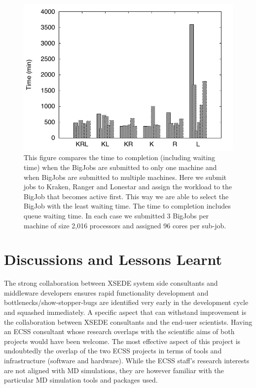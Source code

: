 \documentclass{sig-alternate}
\begin{document}
\begin{figure}
  \centering
  \includegraphics[scale=0.6]{figs/multi_bj_gnu}
  \caption{\footnotesize This figure compares the time to completion
    (including waiting time) when the BigJobs are submitted to only
    one machine and when BigJobs are submitted to multiple
    machines. Here we submit jobs to Kraken, Ranger and Lonestar and
    assign the workload to the BigJob that becomes active first. This
    way we are able to select the BigJob with the least waiting
    time. The time to completion includes queue waiting time. In each
    case we submitted 3 BigJobs per machine of size 2,016 processors
    and assigned 96 cores per sub-job. }
  \label{fig:multi_bigjob}
\end{figure}



\section{Discussions and Lessons Learnt}

The strong collaboration between XSEDE system side consultants
and middleware developers ensures rapid functionality
development and bottlenecks/show-stopper-bugs are identified very
early in the development cycle and squashed immediately. A specific aspect
that can withstand improvement is the collaboration between XSEDE consultants
and the end-user scientists. Having an ECSS consultant whose research overlaps
with the scientific aims of both projects would have been welcome. The most
effective aspect of this project is undoubtedly the overlap of the two ECSS
projects in terms of tools and infrastructure (software and hardware). While the
ECSS staff's research interests are not aligned with MD simulations, they
are however familiar with the particular MD simulation tools and
packages used.
\end{document}
